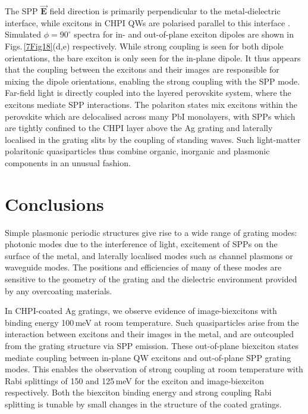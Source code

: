 The SPP $\vec{\mathbf{E}}$ field direction is primarily perpendicular to the metal-dielectric interface, while excitons in CHPI QWs are polarised parallel to this interface \cite{Pradeesh2009b, Mitzi2001b}.  Simulated $\phi=90^{\circ}$ spectra for in- and out-of-plane exciton dipoles are shown in Figs.\,\ref{7Fig18}(d,e) respectively. While strong coupling is seen for both dipole orientations, the bare exciton is only seen for the in-plane dipole. It thus appears that the coupling between the excitons and their images are responsible for mixing the dipole orientations, enabling the strong coupling with the SPP mode. Far-field light is directly coupled into the layered perovskite system, where the excitons mediate SPP interactions. The polariton states mix excitons within the perovskite which are delocalised across many PbI monolayers, with SPPs which are tightly confined to the CHPI layer above the Ag grating and laterally localised in the grating slits by the coupling of standing waves. Such light-matter polaritonic quasiparticles thus combine organic, inorganic and plasmonic components in an unusual fashion.


\section{Conclusions}
Simple plasmonic periodic structures give rise to a wide range of grating modes: photonic modes due to the interference of light, excitement of SPPs on the surface of the metal, and laterally localised modes such as channel plasmons or waveguide modes. The positions and efficiencies of many of these modes are sensitive to the geometry of the grating and the dielectric environment provided by any overcoating materials.

In CHPI-coated Ag gratings, we observe evidence of image-biexcitons with binding energy 100\,meV at room temperature. Such quasiparticles arise from the interaction between excitons and their images in the metal, and are outcoupled from the grating structure via SPP emission. These out-of-plane biexciton states mediate coupling between in-plane QW excitons and out-of-plane SPP grating modes. This enables the observation of strong coupling at room temperature with Rabi splittings of 150 and 125\,meV for the exciton and image-biexciton respectively. Both the biexciton binding energy and strong coupling Rabi splitting is tunable by small changes in the structure of the coated gratings.

